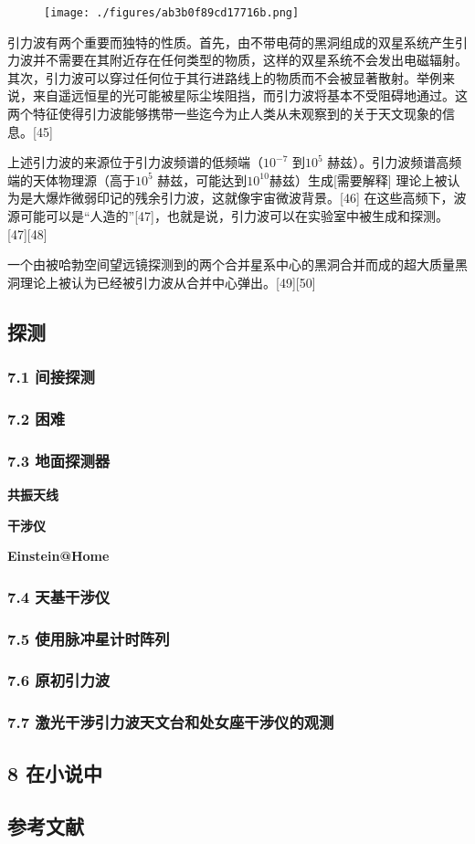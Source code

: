 \begin{figure}[ht]
\centering
\texttt{[image: ./figures/ab3b0f89cd17716b.png]}
\caption \label{fig_YLB_8}
\end{figure}

引力波有两个重要而独特的性质。首先，由不带电荷的黑洞组成的双星系统产生引力波并不需要在其附近存在任何类型的物质，这样的双星系统不会发出电磁辐射。其次，引力波可以穿过任何位于其行进路线上的物质而不会被显著散射。举例来说，来自遥远恒星的光可能被星际尘埃阻挡，而引力波将基本不受阻碍地通过。这两个特征使得引力波能够携带一些迄今为止人类从未观察到的关于天文现象的信息。[45]

上述引力波的来源位于引力波频谱的低频端（$10^{-7}$ 到$10^{5}$ 赫兹）。引力波频谱高频端的天体物理源（高于$10^{5}$ 赫兹，可能达到$10^{10}$赫兹）生成[需要解释] 理论上被认为是大爆炸微弱印记的残余引力波，这就像宇宙微波背景。[46] 在这些高频下，波源可能可以是“人造的”[47]，也就是说，引力波可以在实验室中被生成和探测。[47][48]

一个由被哈勃空间望远镜探测到的两个合并星系中心的黑洞合并而成的超大质量黑洞理论上被认为已经被引力波从合并中心弹出。[49][50]




\subsection{探测}

\subsubsection{7.1 间接探测}

\subsubsection{7.2 困难}

\subsubsection{7.3 地面探测器}

\textbf{共振天线}

\textbf{干涉仪}

\textbf{Einstein@Home}

\subsubsection{7.4 天基干涉仪}

\subsubsection{7.5 使用脉冲星计时阵列}

\subsubsection{7.6 原初引力波}

\subsubsection{7.7 激光干涉引力波天文台和处女座干涉仪的观测}

\subsection{8 在小说中}

\subsection{参考文献}